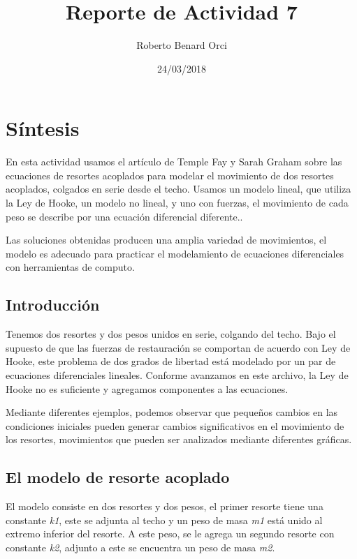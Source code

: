\documentclass{article}
\title{Reporte de Actividad 7}
\author{Roberto Benard Orci}
\date{24/03/2018}
\begin{document}
\maketitle

\section{Síntesis}

En esta actividad usamos el artículo de Temple Fay y Sarah Graham sobre las ecuaciones de resortes acoplados para modelar el movimiento de dos resortes acoplados, colgados en serie desde el techo. Usamos un modelo lineal, que utiliza la Ley de Hooke, un modelo no lineal, y uno con fuerzas, el movimiento de cada peso se describe por una ecuación diferencial diferente..

\vspace{0.3cm}

Las soluciones obtenidas producen una amplia variedad de movimientos, el modelo es adecuado para practicar el modelamiento de ecuaciones diferenciales con herramientas de computo. 

\subsection*{Introducción}

Tenemos dos resortes y dos pesos unidos en serie, colgando del techo. Bajo el supuesto de que las fuerzas de restauración se comportan de acuerdo con Ley de Hooke, este problema de dos grados de libertad está modelado por un par de ecuaciones diferenciales lineales. Conforme avanzamos en este archivo, la Ley de Hooke no es suficiente y agregamos componentes a las ecuaciones.

\vspace{0.3cm}

Mediante diferentes ejemplos, podemos observar que pequeños cambios en las condiciones iniciales pueden generar cambios significativos en el movimiento de los resortes, movimientos que pueden ser analizados mediante diferentes gráficas.

\subsection*{El modelo de resorte acoplado}

El modelo consiste en dos resortes y dos pesos, el primer resorte tiene una constante \textit{k1}, este se adjunta al techo y un peso de masa \textit{m1} está unido al extremo inferior del resorte. A este peso, se le agrega un segundo resorte con constante \textit{k2}, adjunto a este se encuentra un peso de masa \textit{m2}.
\end{document}
